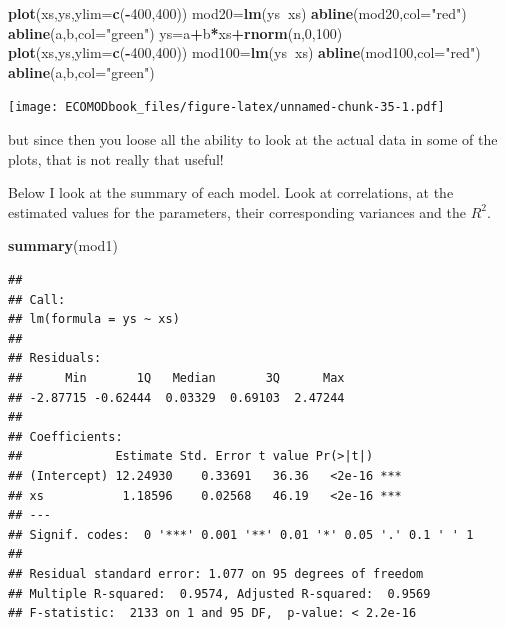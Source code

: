 \documentclass[
]{book}
\newenvironment{Shaded}{\begin{snugshade}}{\end{snugshade}}
\newcommand{\DataTypeTok}[1]{\textcolor[rgb]{0.13,0.29,0.53}{#1}}
\newcommand{\DecValTok}[1]{\textcolor[rgb]{0.00,0.00,0.81}{#1}}
\newcommand{\KeywordTok}[1]{\textcolor[rgb]{0.13,0.29,0.53}{\textbf{#1}}}
\newcommand{\NormalTok}[1]{#1}
\newcommand{\OperatorTok}[1]{\textcolor[rgb]{0.81,0.36,0.00}{\textbf{#1}}}
\newcommand{\StringTok}[1]{\textcolor[rgb]{0.31,0.60,0.02}{#1}}
\begin{document}
\begin{Shaded}
\begin{Highlighting}[]
\KeywordTok{plot}\NormalTok{(xs,ys,}\DataTypeTok{ylim=}\KeywordTok{c}\NormalTok{(}\OperatorTok{-}\DecValTok{400}\NormalTok{,}\DecValTok{400}\NormalTok{))}
\NormalTok{mod20=}\KeywordTok{lm}\NormalTok{(ys}\OperatorTok{~}\NormalTok{xs)}
\KeywordTok{abline}\NormalTok{(mod20,}\DataTypeTok{col=}\StringTok{"red"}\NormalTok{)}
\KeywordTok{abline}\NormalTok{(a,b,}\DataTypeTok{col=}\StringTok{"green"}\NormalTok{)}
\NormalTok{ys=a}\OperatorTok{+}\NormalTok{b}\OperatorTok{*}\NormalTok{xs}\OperatorTok{+}\KeywordTok{rnorm}\NormalTok{(n,}\DecValTok{0}\NormalTok{,}\DecValTok{100}\NormalTok{)}
\KeywordTok{plot}\NormalTok{(xs,ys,}\DataTypeTok{ylim=}\KeywordTok{c}\NormalTok{(}\OperatorTok{-}\DecValTok{400}\NormalTok{,}\DecValTok{400}\NormalTok{))}
\NormalTok{mod100=}\KeywordTok{lm}\NormalTok{(ys}\OperatorTok{~}\NormalTok{xs)}
\KeywordTok{abline}\NormalTok{(mod100,}\DataTypeTok{col=}\StringTok{"red"}\NormalTok{)}
\KeywordTok{abline}\NormalTok{(a,b,}\DataTypeTok{col=}\StringTok{"green"}\NormalTok{)}
\end{Highlighting}
\end{Shaded}

\texttt{[image: ECOMODbook\_files/figure-latex/unnamed-chunk-35-1.pdf]}

but since then you loose all the ability to look at the actual data in some of the plots, that is not really that useful!

Below I look at the summary of each model. Look at correlations, at the estimated values for the parameters, their corresponding variances and the \(R^2\).

\begin{Shaded}
\begin{Highlighting}[]
\KeywordTok{summary}\NormalTok{(mod1)}
\end{Highlighting}
\end{Shaded}

\begin{verbatim}
## 
## Call:
## lm(formula = ys ~ xs)
## 
## Residuals:
##      Min       1Q   Median       3Q      Max 
## -2.87715 -0.62444  0.03329  0.69103  2.47244 
## 
## Coefficients:
##             Estimate Std. Error t value Pr(>|t|)    
## (Intercept) 12.24930    0.33691   36.36   <2e-16 ***
## xs           1.18596    0.02568   46.19   <2e-16 ***
## ---
## Signif. codes:  0 '***' 0.001 '**' 0.01 '*' 0.05 '.' 0.1 ' ' 1
## 
## Residual standard error: 1.077 on 95 degrees of freedom
## Multiple R-squared:  0.9574,	Adjusted R-squared:  0.9569 
## F-statistic:  2133 on 1 and 95 DF,  p-value: < 2.2e-16
\end{verbatim}
\end{document}
